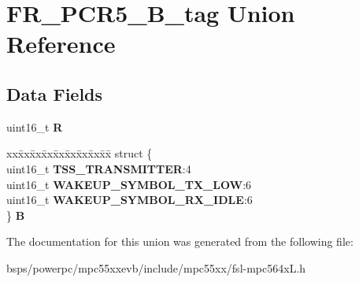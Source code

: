 \hypertarget{unionFR__PCR5__16B__tag}{}\section{F\+R\+\_\+\+P\+C\+R5\+\_\+B\+\_\+tag Union Reference}
\label{unionFR__PCR5__16B__tag}
\subsection*{Data Fields}
\begin{DoxyCompactItemize}
\item 
\mbox{\label{unionFR__PCR5__16B__tag_a32eb9e4973848804c0f6cbeab3f71429}} 
uint16\+\_\+t {\bfseries R}
\item 
\mbox{\label{unionFR__PCR5__16B__tag_ad610a5a155c41e8795e3acb45900c3cd}} 
\begin{tabbing}
xx\=xx\=xx\=xx\=xx\=xx\=xx\=xx\=xx\=\kill
struct \{\\
\>uint16\_t {\bfseries TSS\_TRANSMITTER}:4\\
\>uint16\_t {\bfseries WAKEUP\_SYMBOL\_TX\_LOW}:6\\
\>uint16\_t {\bfseries WAKEUP\_SYMBOL\_RX\_IDLE}:6\\
\} {\bfseries B}\\

\end{tabbing}\end{DoxyCompactItemize}


The documentation for this union was generated from the following file\+:\begin{DoxyCompactItemize}
\item 
bsps/powerpc/mpc55xxevb/include/mpc55xx/fsl-\/mpc564x\+L.\+h\end{DoxyCompactItemize}
